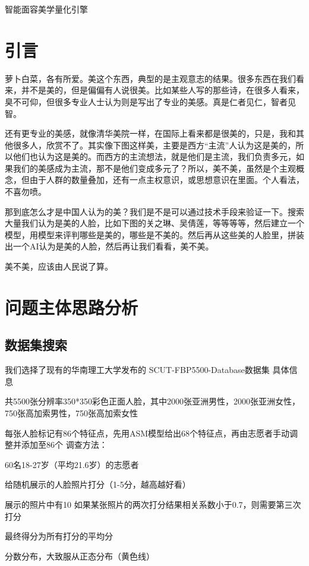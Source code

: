 \documentclass{article}
\begin{document}
\begin{center}
   
    
    \huge{智能面容美学量化引擎}\\
    \vspace{1cm}
    

\end{center}


\section{引言}

萝卜白菜，各有所爱。美这个东西，典型的是主观意志的结果。很多东西在我们看来，并不是美的，但是偏偏有人说很美。比如某些人写的那些诗，在很多人看来，臭不可仰，但很多专业人士认为则是写出了专业的美感。真是仁者见仁，智者见智。\par
还有更专业的美感，就像清华美院一样，在国际上看来都是很美的，只是，我和其他很多人，欣赏不了。其实像下图这样美，主要是西方“主流”人认为这是美的，所以他们也认为这是美的。而西方的主流想法，就是他们是主流，我们负责多元，如果我们的美感成为主流，那不是他们变成多元了？所以，美不美，虽然是个主观概念，但由于人群的数量叠加，还有一点主权意识，或思想意识在里面。个人看法，不喜勿喷。\par
那到底怎么才是中国人认为的美？我们是不是可以通过技术手段来验证一下。搜索大量我们认为是美的人脸，比如下图的关之琳、吴倩莲，等等等等，然后建立一个模型，用模型来评判哪些是美的，哪些是不美的。然后再从这些美的人脸里，拼装出一个AI认为是美的人脸，然后再让我们看看，美不美。\par
美不美，应该由人民说了算。\par

\section{问题主体思路分析}
\subsection{数据集搜索}
我们选择了现有的华南理工大学发布的 SCUT-FBP5500-Database数据集
具体信息\par
共5500张分辨率350*350彩色正面人脸，其中2000张亚洲男性，2000张亚洲女性，750张高加索男性，750张高加索女性\par
每张人脸标记有86个特征点，先用ASM模型给出68个特征点，再由志愿者手动调整并添加至86个
调查方法：\par
60名18-27岁（平均21.6岁）的志愿者\par
给随机展示的人脸照片打分（1-5分，越高越好看）\par
展示的照片中有10%
如果某张照片的两次打分结果相关系数小于0.7，则需要第三次打分\par
最终得分为所有打分的平均分\par
分数分布，大致服从正态分布（黄色线）\par
\end{document}
